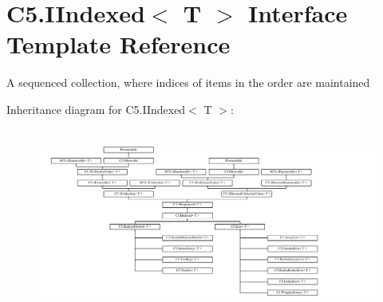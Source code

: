 \hypertarget{interface_c5_1_1_i_indexed}{}\section{C5.\+I\+Indexed$<$ T $>$ Interface Template Reference}
\label{interface_c5_1_1_i_indexed}


A sequenced collection, where indices of items in the order are maintained  


Inheritance diagram for C5.\+I\+Indexed$<$ T $>$\+:\begin{figure}[H]
\begin{center}
\leavevmode
\includegraphics[height=6.134585cm]{interface_c5_1_1_i_indexed}
\end{center}
\end{figure}
